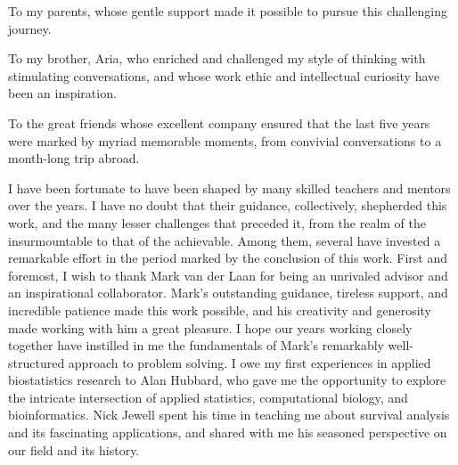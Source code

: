 \documentclass{ucbthesis}
\begin{document}


\maketitle
\copyrightpage



\begin{frontmatter}

\begin{dedication}
\null\vfil
\begin{center}
\vspace{12pt}

To my parents, whose gentle support made it possible to pursue this challenging
journey.

\vspace{22pt}

To my brother, Aria, who enriched and challenged my style of thinking with
stimulating conversations, and whose work ethic and intellectual curiosity have
been an inspiration.

\vspace{22pt}

To the great friends whose excellent company ensured that the last five years
were marked by myriad memorable moments, from convivial conversations to
a month-long trip abroad.

\end{center}
\vfil\null
\end{dedication}


\tableofcontents
\clearpage
\listoffigures
\clearpage
\listoftables

\begin{acknowledgements}

I have been fortunate to have been shaped by many skilled teachers and mentors
over the years. I have no doubt that their guidance, collectively, shepherded
this work, and the many lesser challenges that preceded it, from the realm of
the insurmountable to that of the achievable. Among them, several have invested
a remarkable effort in the period marked by the conclusion of this work. First
and foremost, I wish to thank Mark van der Laan for being an unrivaled advisor
and an inspirational collaborator. Mark's outstanding guidance, tireless
support, and incredible patience made this work possible, and his creativity and
generosity made working with him a great pleasure. I hope our years working
closely together have instilled in me the fundamentals of Mark's remarkably
well-structured approach to problem solving. I owe my first experiences in
applied biostatistics research to Alan Hubbard, who gave me the opportunity to
explore the intricate intersection of applied statistics, computational biology,
and bioinformatics. Nick Jewell spent his time in teaching me about survival
analysis and its fascinating applications, and shared with me his seasoned
perspective on our field and its history.


\end{acknowledgements}
\end{frontmatter}
\end{document}
